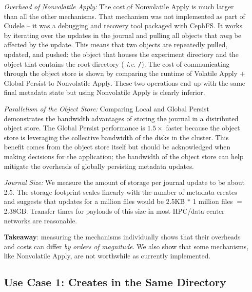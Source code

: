 {\it Overhead of Nonvolatile Apply:} The cost of Nonvolatile
Apply is much larger than all the other mechanisms.  That mechanism was not
implemented as part of Cudele -- it was a debugging and recovery tool packaged
with CephFS. It works by iterating over the updates in the journal and pulling
all objects that {\it may} be affected by the update.  This means that two
objects are repeatedly pulled, updated, and pushed: the object that houses the
experiment directory and the object that contains the root directory ({\it
i.e.} \texttt{/}).  The cost of communicating through the object store is shown
by comparing the runtime of Volatile Apply + Global Persist to
Nonvolatile Apply. These two operations end up with the same final metadata
state but using Nonvolatile Apply is clearly inferior.

{\it Parallelism of the Object Store:} Comparing Local and Global
Persist demonstrates the bandwidth advantages of storing the journal in a
distributed object store. The Global Persist
performance is \(1.5\times\) faster because the object store is leveraging the
collective bandwidth of the disks in the cluster. This benefit comes from the
object store itself but should be acknowledged when making decisions for the
application; the bandwidth of the object store can help mitigate the overheads of
globally persisting metadata updates.

{\it Journal Size:} We measure the amount of storage per journal update to be
about 2.5. The storage footprint scales linearly with the number of
metadata creates and suggests that updates for a million files would be 2.5KB
\(*\) 1 million files \(=\) 2.38GB. Transfer times for payloads of this size in
most HPC/data center networks are reasonable.

\textbf{Takeaway}: measuring the mechanisms individually shows that their
overheads and costs can differ {\it by orders of magnitude}. We also show that
some mechanisms, like Nonvolatile Apply, are not worthwhile as currently
implemented.

\subsection{Use Case 1: Creates in the Same Directory}
\label{sec:use-case-1}


